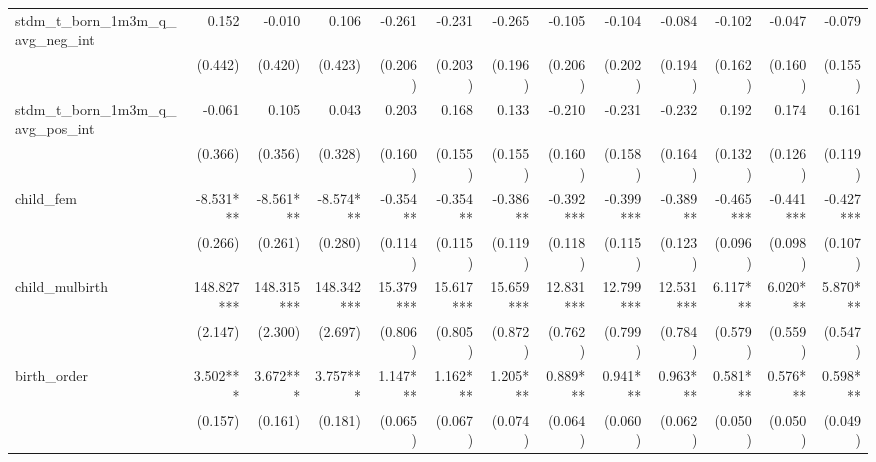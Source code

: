 \begin{tabular}{lrrrrrrrrrrrr}
stdm\_t\_born\_1m3m\_q\_avg\_neg\_int       &        0.152 &       -0.010 &        0.106 &       -0.261 &       -0.231 &       -0.265 &       -0.105 &       -0.104 &       -0.084 &       -0.102 &       -0.047 &       -0.079 \\ 
                                            &      (0.442) &      (0.420) &      (0.423) &      (0.206) &      (0.203) &      (0.196) &      (0.206) &      (0.202) &      (0.194) &      (0.162) &      (0.160) &      (0.155) \\ 
stdm\_t\_born\_1m3m\_q\_avg\_pos\_int       &       -0.061 &        0.105 &        0.043 &        0.203 &        0.168 &        0.133 &       -0.210 &       -0.231 &       -0.232 &        0.192 &        0.174 &        0.161 \\ 
                                            &      (0.366) &      (0.356) &      (0.328) &      (0.160) &      (0.155) &      (0.155) &      (0.160) &      (0.158) &      (0.164) &      (0.132) &      (0.126) &      (0.119) \\ 
child\_fem                                  &    -8.531*** &    -8.561*** &    -8.574*** &     -0.354** &     -0.354** &     -0.386** &    -0.392*** &    -0.399*** &     -0.389** &    -0.465*** &    -0.441*** &    -0.427*** \\ 
                                            &      (0.266) &      (0.261) &      (0.280) &      (0.114) &      (0.115) &      (0.119) &      (0.118) &      (0.115) &      (0.123) &      (0.096) &      (0.098) &      (0.107) \\ 
child\_mulbirth                             &   148.827*** &   148.315*** &   148.342*** &    15.379*** &    15.617*** &    15.659*** &    12.831*** &    12.799*** &    12.531*** &     6.117*** &     6.020*** &     5.870*** \\ 
                                            &      (2.147) &      (2.300) &      (2.697) &      (0.806) &      (0.805) &      (0.872) &      (0.762) &      (0.799) &      (0.784) &      (0.579) &      (0.559) &      (0.547) \\ 
birth\_order                                &     3.502*** &     3.672*** &     3.757*** &     1.147*** &     1.162*** &     1.205*** &     0.889*** &     0.941*** &     0.963*** &     0.581*** &     0.576*** &     0.598*** \\ 
                                            &      (0.157) &      (0.161) &      (0.181) &      (0.065) &      (0.067) &      (0.074) &      (0.064) &      (0.060) &      (0.062) &      (0.050) &      (0.050) &      (0.049) \\ 

\end{tabular}
